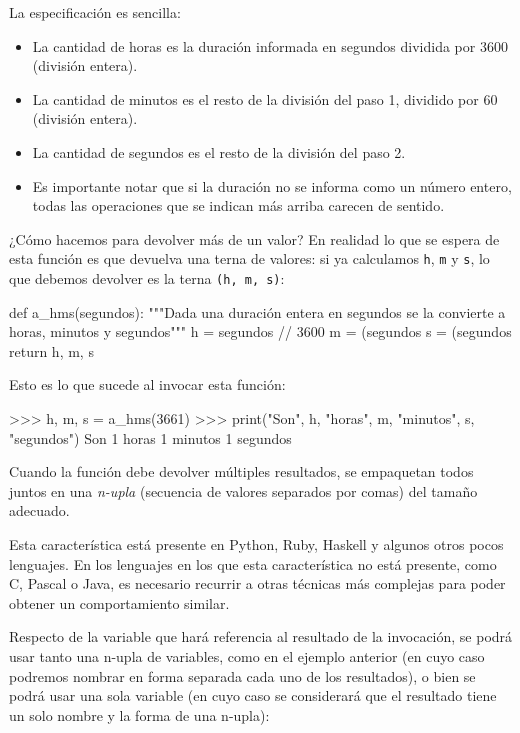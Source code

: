 \begin{solucion}
La especificación es sencilla:
\begin{itemize}
\item La cantidad de horas es la duración informada en segundos dividida
por 3600 (división entera).
\item La cantidad de minutos es el resto de la división del paso 1,
dividido por 60 (división entera).
\item La cantidad de segundos es el resto de la división del paso 2.
\item Es importante notar que si la duración no se informa como un número
entero, todas las operaciones que se indican más arriba carecen de sentido.
\end{itemize}

¿Cómo hacemos para devolver más de un valor? En realidad lo que se espera
de esta función es que devuelva una terna de valores: si ya calculamos
\lstinline!h!, \lstinline!m! y \lstinline!s!, lo que debemos devolver
es la terna \lstinline+(h, m, s)+:

\begin{codigo-python-sn}
def a_hms(segundos):
   """Dada una duración entera en segundos
      se la convierte a horas, minutos y segundos"""
   h = segundos // 3600
   m = (segundos %
   s = (segundos %
   return h, m, s
\end{codigo-python-sn}
\end{solucion}

Esto es lo que sucede al invocar esta función:

\begin{codigo-python-sn}
>>> h, m, s = a_hms(3661)
>>> print("Son", h, "horas", m, "minutos", s, "segundos")
Son 1 horas 1 minutos 1 segundos
\end{codigo-python-sn}

\begin{sabias_que}
Cuando la función debe devolver múltiples resultados, se empaquetan todos juntos
en una \emph{n-upla} (secuencia de valores separados por comas) del tamaño adecuado.

Esta característica está presente en Python, Ruby, Haskell y algunos otros pocos
lenguajes.  En los lenguajes en los que esta característica no está
presente, como C, Pascal o Java, es necesario recurrir a otras
técnicas más complejas para poder obtener un comportamiento similar.
\end{sabias_que}

Respecto de la variable que hará referencia al resultado de la invocación,
se podrá usar tanto una n-upla de variables, como en el ejemplo anterior
(en cuyo caso podremos nombrar en forma separada cada uno de los resultados),
o bien se podrá usar una sola variable (en cuyo caso se considerará que
el resultado tiene un solo nombre y la forma de una n-upla):

